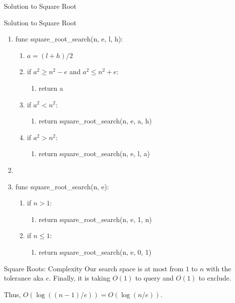 \documentclass[9pt]{beamer}
\newenvironment{pseudobox}[1]{\begin{exampleblock}{#1}\ttfamily\begin{enumerate}[label=\arabic*.,leftmargin=1.4em,itemsep=0pt]}{\end{enumerate}\end{exampleblock}}
\begin{document}
\begin{frame}[fragile]{Solution to Square Root}
\begin{pseudobox}{Solution to Square Root}
\item func square\_root\_search(n, e, l, h):
  \begin{enumerate}[label=\alph*.,leftmargin=1.4em,itemsep=0pt]
  \item $a = (l+h)/2$
  \item if $a^2 \geq n^2 - e$ and $a^2 \leq n^2 + e$:
    \begin{enumerate}[label=\roman*.,leftmargin=1.4em,itemsep=0pt]
    \item return a
    \end{enumerate}
  \item if $a^2 < n^2$:
    \begin{enumerate}[label=\roman*.,leftmargin=1.4em,itemsep=0pt]
    \item return square\_root\_search(n, e, a, h)
    \end{enumerate}
  \item if $a^2 > n^2$:
    \begin{enumerate}[label=\roman*.,leftmargin=1.4em,itemsep=0pt]
    \item return square\_root\_search(n, e, l, a)
    \end{enumerate}
  \end{enumerate}
\item {}
\item func square\_root\_search(n, e):
  \begin{enumerate}[label=\alph*.,leftmargin=1.4em,itemsep=0pt]
  \item if $n > 1$:
    \begin{enumerate}[label=\roman*.,leftmargin=1.4em,itemsep=0pt]
    \item return square\_root\_search(n, e, 1, n)
    \end{enumerate}
  \item if $n \leq 1$:
    \begin{enumerate}[label=\roman*.,leftmargin=1.4em,itemsep=0pt]
    \item return square\_root\_search(n, e, 0, 1)
    \end{enumerate}
  \end{enumerate}
\end{pseudobox}
\end{frame}

\begin{frame}{Square Roots: Complexity}
Our search space is at most from $1$ to $n$ with the tolerance aka $e$. Finally, it is taking $O(1)$ to query and $O(1)$ to exclude.

Thus, $O(\log((n-1)/e)) = O(\log(n/e))$.
\end{frame}
\end{document}
